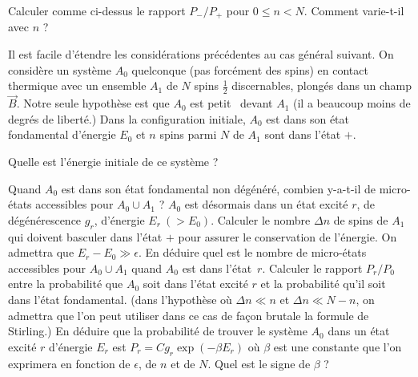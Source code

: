 \question Calculer comme ci-dessus le rapport $P_-/P_+$ pour $0 \le n < N$. Comment varie-t-il avec $n$ ?

\medskip

Il est facile d'étendre les considérations précédentes au cas général suivant.  On considère un système $A_0$ quelconque (pas forcément des spins) en contact thermique avec un ensemble $A_1$ de $N$ spins $\frac{1}{2}$ discernables, plongés dans un champ $\vec B$. Notre seule hypothèse est que $A_0$ est \og petit \fg \ devant $A_1$ (il a beaucoup moins de degrés de liberté.) Dans la configuration initiale, $A_0$ est dans son état fondamental d'énergie $E_0$ et $n$ spins parmi $N$ de $A_1$ sont dans l'état $+$.

\medskip

\question Quelle est l'énergie initiale de ce système ?

\question Quand $A_0$ est dans son état fondamental non dégénéré, combien y-a-t-il de micro-états accessibles pour $A_0 \cup A_1$ ?
\question $A_0$ est désormais dans un état excité $r$, de dégénérescence $g_r$, d'énergie $E_r \ (>E_0)$. Calculer le nombre $\Delta n$ de spins de $A_1$ qui doivent basculer dans l'état $+$ pour assurer le conservation de l'énergie. On admettra que $E_r-E_0 \gg \epsilon$. En déduire quel est le nombre de micro-états accessibles pour $A_0 \cup A_1$ quand $A_0$ est dans \mbox{l'état $r$}.
\question Calculer le rapport $P_r/P_0$ entre la probabilité que $A_0$ soit dans l'état excité $r$ et la probabilité qu'il soit dans l'état  fondamental. (dans l'hypothèse où $\Delta n \ll n$ et $\Delta n \ll N-n$, on admettra que l'on peut utiliser dans ce cas de façon brutale la formule de Stirling.)
\question En déduire que la probabilité de trouver le système $A_0$ dans un état excité $r$ d'énergie $E_r$ est \mbox{$P_r=C g_r \exp(-\beta E_r)$} où $\beta $ est une constante que l'on exprimera en fonction de $\epsilon$, de $n$ et de $N$. Quel est le signe de $\beta $ ?
